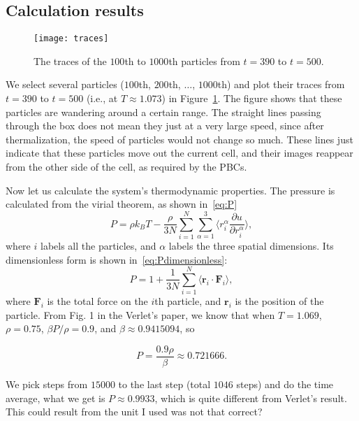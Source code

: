 \subsection{Calculation results}

\begin{figure}[H]
    \centering
    \texttt{[image: traces]}
    \caption{The traces of the $100$th to $1000$th particles from $t = 390$ to $t = 500$.}
    \label{fig:traces}
\end{figure}

We select several particles ($100$th, $200$th, $\ldots$, $1000$th) and plot their traces
from $t = 390$ to $t = 500$ (i.e., at $T \approx 1.073$) in Figure~\ref{fig:traces}.
The figure shows that these particles are wandering around a certain
range. The straight lines passing through the box does not mean they just at a very
large speed, since after thermalization, the speed of particles would not change so
much. These lines just indicate that these particles move out the current cell,
and their images reappear from the other side of the cell, as required by the PBCs.

Now let us calculate the  system's thermodynamic properties.
The pressure is calculated from the virial theorem, as shown in~\eqref{eq:P}
%
\begin{equation}\label{eq:P}
    P = \rho k_B T - \frac{ \rho }{ 3N } \sum_{i=1}^{N} \sum_{\alpha=1}^{3}
    \biggl \langle r_i^\alpha \frac{ \partial u }{ \partial r_i^\alpha } \biggr \rangle,
\end{equation}
%
where $i$ labels all the particles, and $\alpha$ labels the three spatial dimensions.
Its dimensionless form is shown in~\eqref{eq:Pdimensionless}\cite{thijssen_2007}:
%
\begin{equation}\label{eq:Pdimensionless}
    P = 1 + \frac{ 1 }{ 3N } \sum_{i=1}^{N}
    \langle \bm{r}_i \cdot \bm{F}_i \rangle,
\end{equation}
%
where $\bm{F}_i$ is the total force on the $i$th particle, and $\bm{r}_i$ is the
position of the particle.
From Fig. 1 in the Verlet's paper\cite{Verlet}, we know that when $T = 1.069$,
$\rho = 0.75$, $\beta P / \rho = 0.9$, and $\beta \approx 0.9415094$, so

\begin{equation}
    P = \frac{ 0.9 \rho }{ \beta } \approx 0.721666.
\end{equation}

We pick steps from $15000$ to the last step (total $1046$ steps) and do the time average,
what we get is $P \approx 0.9933$, which is quite different from Verlet's result.
This could result from the unit I used was not that correct?

